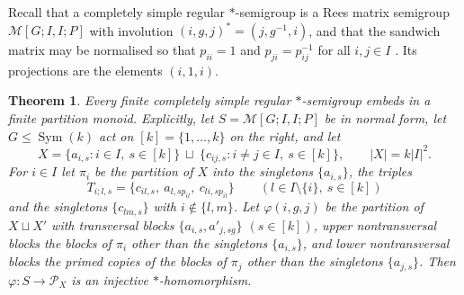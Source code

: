 \documentclass[11pt]{amsart}
\newtheorem{theorem}{Theorem}[section]
\theoremstyle{definition}
\renewcommand{\P}{\mathcal{P}}      %
\newcommand{\Sym}{\operatorname{Sym}}
\begin{document}
Recall that a completely simple regular $*$-semigroup is a Rees matrix semigroup $\mathcal M[G;I,I;P]$ with involution $(i,g,j)^*=(j,g^{-1},i)$, and that the sandwich matrix may be normalised so that $p_{ii}=1$ and $p_{ji}=p_{ij}^{-1}$ for all $i,j\in I$ \cite{NS}. Its projections are the elements $(i,1,i)$.

\begin{theorem}\label{thm:cs}
Every finite completely simple regular $*$-semigroup embeds in a finite partition monoid. Explicitly, let $S=\mathcal M[G;I,I;P]$ be in normal form, let $G\le\Sym(k)$ act on $[k]=\{1,\dots,k\}$ on the right, and let
\[
X=\{a_{i,s}: i\in I,\ s\in[k]\}\ \sqcup\ \{c_{ij,s}: i\ne j\in I,\ s\in[k]\},\qquad |X|=k|I|^2 .
\]
For $i\in I$ let $\pi_i$ be the partition of $X$ into the singletons $\{a_{i,s}\}$, the triples
\[
T_{i;l,s}=\{c_{il,s},\ a_{l,sp_{il}},\ c_{li,sp_{il}}\}\qquad(l\in I\setminus\{i\},\ s\in[k])
\]
and the singletons $\{c_{lm,s}\}$ with $i\notin\{l,m\}$. Let $\varphi(i,g,j)$ be the partition of $X\sqcup X'$ with transversal blocks $\{a_{i,s},a'_{j,sg}\}$ $(s\in[k])$, upper nontransversal blocks the blocks of $\pi_i$ other than the singletons $\{a_{i,s}\}$, and lower nontransversal blocks the primed copies of the blocks of $\pi_j$ other than the singletons $\{a_{j,s}\}$. Then $\varphi\colon S\to\P_X$ is an injective $*$-homomorphism.
\end{theorem}
\end{document}
